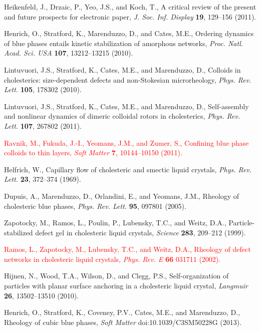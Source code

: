 \documentclass[12pt]{article}
\begin{document}
\begin{thebibliography}{99}
Heikenfeld, J., Drzaic, P., Yeo, J.S., and Koch, T.,
A critical review of the present and future prospects for electronic paper,
{\it J. Soc. Inf. Display} {\bf 19}, 129--156 (2011).

Henrich, O., Stratford, K., Marenduzzo, D., and  Cates, M.E.,
Ordering dynamics of blue phases entails kinetic stabilization of amorphous
networks, {\it Proc. Natl. Acad. Sci. USA} {\bf 107}, 13212--13215 (2010).

Lintuvuori, J.S.,  Stratford, K., Cates, M.E., and Marenduzzo, D.,
Colloids in cholesterics: size-dependent defects and non-Stokesian
microrheology, {\it Phys. Rev. Lett.} {\bf 105}, 178302 (2010).

Lintuvuori, J.S.,  Stratford, K.,  Cates, M.E., and  Marenduzzo, D.,
Self-assembly and nonlinear dynamics of dimeric colloidal rotors in 
cholesterics, {\it Phys. Rev. Lett.} {\bf 107}, 267802 (2011).

\textcolor{red}{Ravnik, M., Fukuda, J.-I.,  Yeomans, J.M., and Zumer, S.,
Confining blue phase colloids to thin layers,
{\it Soft Matter} {\bf 7}, 10144--10150 (2011).}

 	Helfrich, W.,
Capillary flow of cholesteric and smectic liquid crystals,
{\it Phys. Rev. Lett.} {\bf 23}, 372--374 (1969).

Dupuis, A.,  Marenduzzo, D.,  Orlandini, E., and Yeomans, J.M.,
Rheology of cholesteric blue phases,
{\it Phys. Rev. Lett.} {\bf 95}, 097801 (2005).

Zapotocky, M., Ramos, L., Poulin, P.,  Lubensky, T.C.,  and Weitz, D.A.,
Particle-stabilized defect gel in cholesteric liquid crystals,
{\it Science} {\bf 283}, 209--212 (1999).

\textcolor{red}{
Ramos, L., Zapotocky, M.,  Lubensky, T.C., and  Weitz, D.A.,
Rheology of defect networks in cholesteric liquid crystals,
{\it Phys. Rev. E} {\bf 66} 031711 (2002).}

 Hijnen, N., Wood, T.A., Wilson, D., and Clegg, P.S., 
Self-organization of particles with planar surface anchoring in a cholesteric
liquid crystal, {\it Langmuir} {\bf 26}, 13502--13510 (2010).

Henrich, O., Stratford, K., Coveney, P.V., Cates, M.E., and Marenduzzo, D.,
Rheology of cubic blue phases,
{\it Soft Matter} doi:10.1039/C3SM50228G (2013).


\end{thebibliography}
\end{document}

